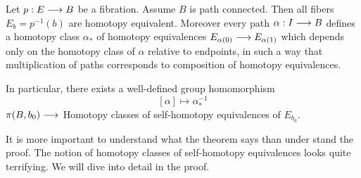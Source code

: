 \documentclass[11pt]{book} %
\begin{document}
\begin{theorem}
Let $p: E\longrightarrow B$ be a fibration. Assume $B$ is path connected. Then all fibers $E_b=p^{-1}(b)$ are homotopy equivalent. Moreover every path $\alpha: I\longrightarrow B$ defines a homotopy class $\alpha_*$ of homotopy equivalences $E_{\alpha(0)}\longrightarrow E_{\alpha(1)}$ which depends only on the homotopy class of $\alpha$ relative to endpoints, in such a way that multiplication of paths corresponds to composition of homotopy equivalences.

In particular, there exists a well-defined group homomorphism
$$
[\alpha]\mapsto \alpha^{-1}_*
$$
$\pi(B,b_0)\longrightarrow $ Homotopy classes of self-homotopy equivalences of $E_{b_0}$.
\end{theorem}
\begin{remark}
It is more important to understand what the theorem says than under stand the proof. The notion of homotopy classes of self-homotopy equivalences looks quite terrifying. We will dive into detail in the proof.
\end{remark}
\end{document}
